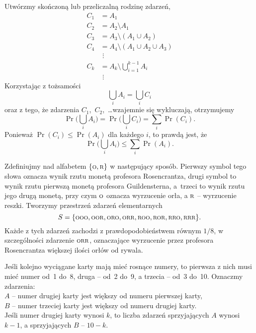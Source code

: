 
\exercise{} %
\noindent Utwórzmy skończoną lub przeliczalną rodzinę zdarzeń,
\begin{align*}
	C_1 &= A_1 \\
	C_2 &= A_2\setminus A_1 \\
	C_3 &= A_3\setminus (A_1\cup A_2) \\
	C_4 &= A_4\setminus (A_1\cup A_2\cup A_3) \\
	& \,\,\vdots \\
	C_k &= A_k\setminus \bigcup_{i=1}^{k-1}A_i \\
	& \,\,\vdots
\end{align*}
Korzystając z tożsamości
\[
	\bigcup_iA_i = \bigcup_iC_i
\]
oraz z tego, że zdarzenia $C_1$,~$C_2$,~\dots wzajemnie się wykluczają, otrzymujemy
\[
	\Pr\biggl(\bigcup_iA_i\biggr) = \Pr\biggl(\bigcup_iC_i\biggr) = \sum_i\Pr(C_i).
\]
Ponieważ $\Pr(C_i)\le\Pr(A_i)$ dla każdego $i$, to prawdą jest, że
\[
	\Pr\biggl(\bigcup_iA_i\biggr) \le \sum_i\Pr(A_i).
\]

\exercise{} %
\noindent Zdefiniujmy  nad alfabetem $\{{\scriptstyle\rm O},{\scriptstyle\rm R}\}$ w następujący sposób. Pierwszy symbol tego słowa oznacza wynik rzutu monetą profesora Rosencrantza, drugi symbol to wynik rzutu pierwszą monetą profesora Guildensterna, a~trzeci to wynik rzutu jego drugą monetą, przy czym $\scriptstyle\rm O$ oznacza wyrzucenie orła, a $\scriptstyle\rm R$ -- wyrzucenie reszki. Tworzymy przestrzeń zdarzeń elementarnych
\[
	S = \{{\scriptstyle\rm OOO},{\scriptstyle\rm OOR},{\scriptstyle\rm ORO},{\scriptstyle\rm ORR},{\scriptstyle\rm ROO},{\scriptstyle\rm ROR},{\scriptstyle\rm RRO},{\scriptstyle\rm RRR}\}.
\]
Każde z tych zdarzeń zachodzi z prawdopodobieństwem równym $1/8$, w szczególności zdarzenie $\scriptstyle\rm ORR$, oznaczające wyrzucenie przez profesora Rosencrantza większej ilości orłów od rywala.

\exercise{} %
\noindent Jeśli kolejno wyciągane karty mają mieć rosnące numery, to pierwsza z nich musi mieć numer od~1 do~8, druga -- od~2 do~9, a trzecia -- od~3 do~10. Oznaczmy zdarzenia: \\
\hspace*{\parindent}$A$ -- numer drugiej karty jest większy od numeru pierwszej karty, \\
\hspace*{\parindent}$B$ -- numer trzeciej karty jest większy od numeru drugiej karty. \\
Jeśli numer drugiej karty wynosi $k$, to liczba zdarzeń sprzyjających $A$ wynosi $k-1$, a sprzyjających $B$ -- $10-k$.

